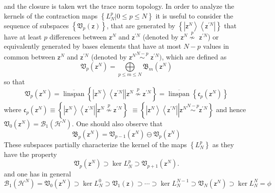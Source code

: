 \documentclass[aps,preprint]{revtex4}%
\begin{document}
and the closure is taken wrt the trace norm topology. In order to analyze the
kernels of the contraction maps $\left\{  L_{N}^{p}|0\leq p\leq N\right\}  $
it is useful to consider the sequence of subspaces $\left\{  \mathfrak{V}%
_{p}\left(  \mathsf{z}\right)  \right\}  $, that are generated by $\left\{
\left\vert \mathsf{z}^{N}\right\rangle \left\langle \mathsf{z}^{\prime
N}\right\vert \right\}  $ that have at least $p$ differences between
$\mathsf{z}^{N}$ and $\mathsf{z}^{\prime N}$ (denoted by $\mathsf{z}%
^{N}\overset{p}{\nsim}$ $\mathsf{z}^{\prime N}$) or equivalently generated by
bases elements that have at most $N-p$ values in common between $\mathsf{z}%
^{N}$ and $\mathsf{z}^{\prime N}$ (denoted by $\mathsf{z}^{N}\overset
{N-p}{\sim}$ $\mathsf{z}^{\prime N})$, which are defined as
\begin{equation}
\mathfrak{V}_{p}\left(  \mathsf{z}^{N}\right)  =%
{\displaystyle\bigoplus\limits_{p\leq m\leq N}}
\mathfrak{B}_{m}\left(  \mathsf{z}^{N}\right)
\end{equation}
so that
\begin{equation}
\mathfrak{V}_{p}\left(  \mathsf{z}^{N}\right)  =\overline
{\operatorname{linspan}}\left\{  \left.  \left\vert \mathsf{z}^{N}%
\right\rangle \left\langle \mathsf{z}^{\prime N}\right\vert \overset{}%
{}\right\vert \mathsf{z}^{N}\overset{p}{\nsim}\mathsf{z}^{\prime N}\right\}
=\overline{\operatorname{linspan}}\left\{  \mathfrak{c}_{p}\left(
\mathsf{z}^{N}\right)  \right\}
\end{equation}
where $\mathfrak{c}_{p}\left(  \mathsf{z}^{N}\right)  \equiv\left\{  \left.
\underset{}{\left\vert \mathsf{z}^{N}\right\rangle \left\langle \mathsf{z}%
^{\prime N}\right\vert }\right\vert \mathsf{z}^{N}\overset{p}{\nsim}%
\mathsf{z}^{\prime N}\right\}  $ $\equiv\left\{  \left.  \underset
{}{\left\vert \mathsf{z}^{N}\right\rangle \left\langle \mathsf{z}^{\prime
N}\right\vert }\right\vert \mathsf{z}^{N}\overset{N-p}{\sim}\mathsf{z}^{\prime
N}\right\}  $ and hence $\mathfrak{V}_{0}\left(  \mathsf{z}^{N}\right)
=\mathcal{B}_{1}\left(  \mathcal{H}^{N}\right)  $. One should also observe
that
\begin{equation}
\mathfrak{B}_{p}\left(  \mathsf{z}^{N}\right)  =\mathfrak{V}_{p-1}\left(
\mathsf{z}^{N}\right)  \ominus\mathfrak{V}_{p}\left(  \mathsf{z}^{N}\right)
\end{equation}
These subspaces partially characterize the kernel of the maps $\left\{
L_{N}^{p}\right\}  $ as they have the property
\begin{equation}
\mathfrak{V}_{p}\left(  \mathsf{z}^{N}\right)  \supset\ker L_{N}^{p}%
\supset\mathfrak{V}_{p+1}\left(  \mathsf{z}^{N}\right)  .
\end{equation}
and one has in general%
\begin{equation}
\mathcal{B}_{1}\left(  \mathcal{H}^{N}\right)  =\mathfrak{V}_{0}\left(
\mathsf{z}^{N}\right)  \supset\ker L_{N}^{0}\supset\mathfrak{V}_{1}\left(
\mathsf{z}\right)  \supset\cdots\supset\ker L_{N}^{N-1}\supset\mathfrak{V}%
_{N}\left(  \mathsf{z}^{N}\right)  \supset\ker L_{N}^{N}=\phi
\end{equation}
\end{document}
